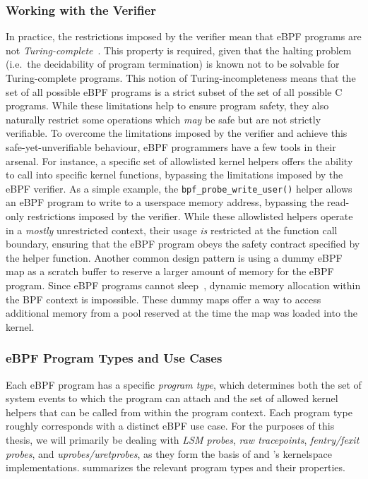 \subsubsection*{Working with the Verifier}

In practice, the restrictions imposed by the verifier mean that eBPF programs are not
\textit{Turing-complete}~\cite{gregg2019_bpf}.  This property is required, given that the
halting problem (i.e.~the decidability of program termination) is known not to be solvable
for Turing-complete programs. This notion of Turing-incompleteness means that the set of
all possible eBPF programs is a strict subset of the set of all possible C programs. While
these limitations help to ensure program safety, they also naturally restrict some
operations which \textit{may} be safe but are not strictly verifiable. To overcome the
limitations imposed by the verifier and achieve this safe-yet-unverifiable behaviour, eBPF
programmers have a few tools in their arsenal. For instance, a specific set of allowlisted
kernel helpers offers the ability to call into specific kernel functions, bypassing the
limitations imposed by the eBPF verifier. As a simple example, the
\texttt{bpf\_probe\_write\_user()} helper allows an eBPF program to write to a userspace
memory address, bypassing the read-only restrictions imposed by the verifier. While these
allowlisted helpers operate in a \textit{mostly} unrestricted context, their usage
\textit{is} restricted at the function call boundary, ensuring that the eBPF program obeys
the safety contract specified by the helper function.  Another common design pattern is
using a dummy eBPF map as a scratch buffer to reserve a larger amount of memory for the
eBPF program.  Since eBPF programs cannot sleep~\cite{gregg2019_bpf}, dynamic memory
allocation within the BPF context is impossible. These dummy maps offer a way to access
additional memory from a pool reserved at the time the map was loaded into the kernel.

\subsubsection*{eBPF Program Types and Use Cases}

Each eBPF program has a specific \textit{program type}, which determines both the set of
system events to which the program can attach and the set of allowed kernel helpers that
can be called from within the program context. Each program type roughly corresponds with
a distinct eBPF use case. For the purposes of this thesis, we will primarily be dealing
with \textit{LSM probes}, \textit{raw tracepoints}, \textit{fentry/fexit probes}, and
\textit{uprobes/uretprobes}, as they form the basis of \bpfbox{} and \bpfcontain{}'s
kernelspace implementations.  summarizes the relevant program types
and their properties.

